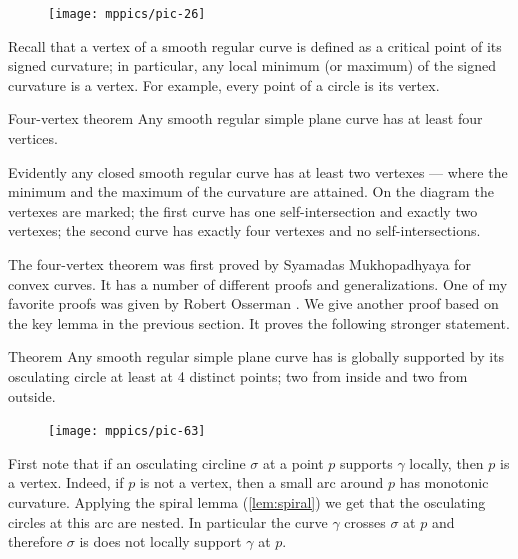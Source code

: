 {

\begin{figure}
\vskip-0mm
\centering
\texttt{[image: mppics/pic-26]}
\vskip0mm
\end{figure}

Recall that a vertex of a smooth regular curve is defined as a critical point of its signed curvature;
in particular, any local minimum (or maximum) of the signed curvature is a vertex.
For example, every point of a circle is its vertex.

\begin{thm}{Four-vertex theorem}\label{thm:4-vert}
Any smooth regular simple plane curve has at least four
vertices.
\end{thm}

}

Evidently any closed smooth regular curve has at least two vertexes --- where the minimum and the maximum of the curvature are attained.
On the diagram the vertexes are marked;
the first curve has one self-intersection and exactly two vertexes;
the second curve has exactly four vertexes and no self-intersections.

The four-vertex theorem was first proved by Syamadas Mukhopadhyaya \cite{mukhopadhyaya} for convex curves.
It has a number of different proofs and generalizations.
One of my favorite proofs was given by Robert Osserman \cite{osserman}.
We give another proof based on the key lemma in the previous section.
It proves the following stronger statement.

\begin{thm}{Theorem}\label{thm:4-vert-supporting}
Any smooth regular simple plane curve has is globally supported by its osculating circle at least at 4 distinct points; two from inside and two from outside.
\end{thm}

{

\begin{figure}
\vskip-2mm
\centering
\texttt{[image: mppics/pic-63]}
\vskip0mm
\end{figure}

First note that if an osculating circline $\sigma$ at a point $p$ supports $\gamma$ locally, then $p$ is a vertex.
Indeed, if $p$ is not a vertex, then a small arc around $p$ has monotonic curvature.
Applying the spiral lemma (\ref{lem:spiral}) we get that the osculating circles at this arc are nested.
In particular the curve $\gamma$ crosses $\sigma$ at $p$ and therefore $\sigma$ is does not locally support $\gamma$ at $p$.
\qeds

}

